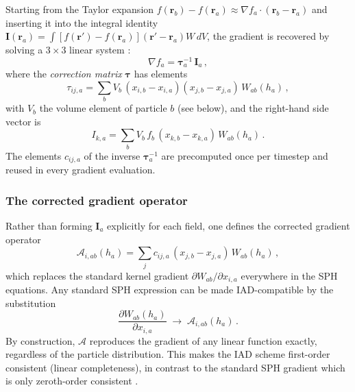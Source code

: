 Starting from the Taylor expansion $f(\mathbf{r}_b) - f(\mathbf{r}_a) \approx \nabla f_a \cdot (\mathbf{r}_b - \mathbf{r}_a)$ and inserting it into the integral identity $\mathbf{I}(\mathbf{r}_a) = \int [f(\mathbf{r}') - f(\mathbf{r}_a)](\mathbf{r}' - \mathbf{r}_a) W \, dV$, the gradient is recovered by solving a $3 \times 3$ linear system \cite{GarciaSenz2012}:
\begin{equation}
    \nabla f_a = \boldsymbol{\tau}_a^{-1} \, \mathbf{I}_a \,,
    \label{eq:iad_system}
\end{equation}
where the \emph{correction matrix} $\boldsymbol{\tau}$ has elements
\begin{equation}
    \tau_{ij,a} = \sum_b V_b \, (x_{i,b} - x_{i,a})(x_{j,b} - x_{j,a}) \, W_{ab}(h_a)\,,
    \label{eq:tau_matrix}
\end{equation}
with $V_b$ the volume element of particle $b$ (see below), and the right-hand side vector is
\begin{equation}
    I_{k,a} = \sum_b V_b \, f_b \, (x_{k,b} - x_{k,a}) \, W_{ab}(h_a)\,.
    \label{eq:iad_rhs}
\end{equation}
The elements $c_{ij,a}$ of the inverse $\boldsymbol{\tau}_a^{-1}$ are precomputed once per timestep and reused in every gradient evaluation.


\subsubsection*{The corrected gradient operator}

Rather than forming $\mathbf{I}_a$ explicitly for each field, one defines the corrected gradient operator \cite{GarciaSenz2012, Cabezon2017}
\begin{equation}
    \mathcal{A}_{i,ab}(h_a) = \sum_{j} c_{ij,a} \, (x_{j,b} - x_{j,a}) \, W_{ab}(h_a)\,,
    \label{eq:iad_grad}
\end{equation}
which replaces the standard kernel gradient $\partial W_{ab} / \partial x_{i,a}$ everywhere in the SPH equations. Any standard SPH expression can be made IAD-compatible by the substitution
\begin{equation}
    \frac{\partial W_{ab}(h_a)}{\partial x_{i,a}} \;\longrightarrow\; \mathcal{A}_{i,ab}(h_a)\,.
    \label{eq:iad_replacement}
\end{equation}
By construction, $\mathcal{A}$ reproduces the gradient of any linear function exactly, regardless of the particle distribution. This makes the IAD scheme first-order consistent (linear completeness), in contrast to the standard SPH gradient which is only zeroth-order consistent \cite{GarciaSenz2012}.


